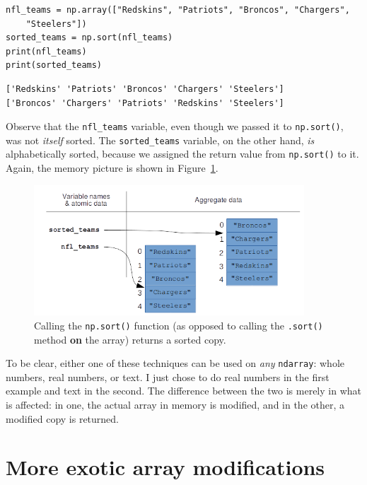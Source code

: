 \begin{Verbatim}[fontsize=\small,samepage=true,frame=single,framesep=3mm]
nfl_teams = np.array(["Redskins", "Patriots", "Broncos", "Chargers",
    "Steelers"])
sorted_teams = np.sort(nfl_teams)
print(nfl_teams)
print(sorted_teams)
\end{Verbatim}

\begin{Verbatim}[fontsize=\small,samepage=true,frame=leftline,framesep=5mm,framerule=1mm]
['Redskins' 'Patriots' 'Broncos' 'Chargers' 'Steelers']
['Broncos' 'Chargers' 'Patriots' 'Redskins' 'Steelers']
\end{Verbatim}

Observe that the \texttt{nfl\_teams} variable, even though we passed it to
\texttt{np.sort()}, was not \textit{itself} sorted. The \texttt{sorted\_teams}
variable, on the other hand, \textit{is} alphabetically sorted, because we
assigned the return value from \texttt{np.sort()} to it. Again, the memory
picture is shown in Figure~\ref{fig:npSortArray}.

\begin{figure}[ht]
\centering
\includegraphics[width=0.9\textwidth]{npSortArray.png}
\medskip
\caption{Calling the \texttt{np.sort()} function (as opposed to calling the
\texttt{.sort()} method \textbf{on} the array) returns a sorted copy.}
\label{fig:npSortArray}
\end{figure}

To be clear, either one of these techniques can be used on \textit{any}
\texttt{ndarray}: whole numbers, real numbers, or text. I just chose to do real
numbers in the first example and text in the second. The difference between the
two is merely in what is affected: in one, the actual array in memory is
modified, and in the other, a modified copy is returned.

\section{More exotic array modifications}

